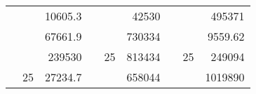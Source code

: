 \begin{table}[H]
\begin{tabular}{|ccrccrccc}
\rowcolor[HTML]{DAE8FC} 
\multicolumn{1}{|c|}{\cellcolor[HTML]{FFFFC7}}                                & \multicolumn{1}{c|}{\cellcolor[HTML]{DAE8FC}}                      & \multicolumn{1}{r|}{\cellcolor[HTML]{DAE8FC}10605.3}   & \multicolumn{1}{c|}{\cellcolor[HTML]{FFFFC7}}                                & \multicolumn{1}{c|}{\cellcolor[HTML]{DAE8FC}}                       & \multicolumn{1}{r|}{\cellcolor[HTML]{DAE8FC}42530}     & \multicolumn{1}{c|}{\cellcolor[HTML]{FFFFC7}}                                & \multicolumn{1}{c|}{\cellcolor[HTML]{DAE8FC}}                      & \multicolumn{1}{r|}{\cellcolor[HTML]{DAE8FC}495371}    \\ \cline{3-3} \cline{6-6} \cline{9-9} 
\multicolumn{1}{|c|}{\cellcolor[HTML]{FFFFC7}}                                & \multicolumn{1}{c|}{\cellcolor[HTML]{DAE8FC}}                      & \multicolumn{1}{r|}{\cellcolor[HTML]{DDFDFF}67661.9}   & \multicolumn{1}{c|}{\cellcolor[HTML]{FFFFC7}}                                & \multicolumn{1}{c|}{\cellcolor[HTML]{DAE8FC}}                       & \multicolumn{1}{r|}{\cellcolor[HTML]{DDFDFF}730334}    & \multicolumn{1}{c|}{\cellcolor[HTML]{FFFFC7}}                                & \multicolumn{1}{c|}{\cellcolor[HTML]{DAE8FC}}                      & \multicolumn{1}{r|}{\cellcolor[HTML]{DDFDFF}9559.62}   \\ \cline{3-3} \cline{6-6} \cline{9-9} 
\rowcolor[HTML]{DAE8FC} 
\multicolumn{1}{|c|}{\cellcolor[HTML]{FFFFC7}}                                & \multicolumn{1}{c|}{\cellcolor[HTML]{DAE8FC}}                      & \multicolumn{1}{r|}{\cellcolor[HTML]{DAE8FC}239530}    & \multicolumn{1}{c|}{\cellcolor[HTML]{FFFFC7}}                                & \multicolumn{1}{c|}{\multirow{-9}{*}{\cellcolor[HTML]{DAE8FC}25}}   & \multicolumn{1}{r|}{\cellcolor[HTML]{DAE8FC}813434}    & \multicolumn{1}{c|}{\cellcolor[HTML]{FFFFC7}}                                & \multicolumn{1}{c|}{\multirow{-9}{*}{\cellcolor[HTML]{DAE8FC}25}}  & \multicolumn{1}{r|}{\cellcolor[HTML]{DAE8FC}249094}    \\ \cline{3-3} \cline{5-6} \cline{8-9} 
\multicolumn{1}{|c|}{\cellcolor[HTML]{FFFFC7}}                                & \multicolumn{1}{c|}{\multirow{-10}{*}{\cellcolor[HTML]{DAE8FC}25}} & \multicolumn{1}{r|}{\cellcolor[HTML]{DDFDFF}27234.7}   & \multicolumn{1}{c|}{\cellcolor[HTML]{FFFFC7}}                                & \multicolumn{1}{c|}{\cellcolor[HTML]{DDFDFF}}                       & \multicolumn{1}{r|}{\cellcolor[HTML]{DAE8FC}658044}    & \multicolumn{1}{c|}{\cellcolor[HTML]{FFFFC7}}                                & \multicolumn{1}{c|}{\cellcolor[HTML]{DDFDFF}}                      & \multicolumn{1}{r|}{\cellcolor[HTML]{DAE8FC}1019890}   \\ \cline{2-3} \cline{6-6} \cline{9-9} 

\end{tabular}
\end{table}
